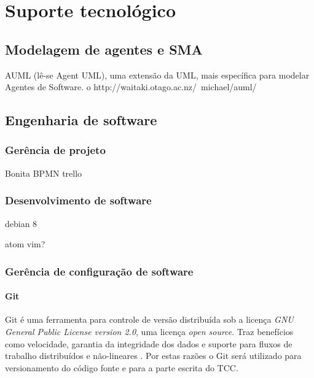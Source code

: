 \chapter[Suporte tecnológico]{Suporte tecnológico}\label{ch:suporte}

\section{Modelagem de agentes e SMA}



AUML (lê-se Agent UML), uma extensão da UML,
mais específica para modelar Agentes de Software.
o http://waitaki.otago.ac.nz/~michael/auml/



\section{Engenharia de software}

\subsection{Gerência de projeto}

Bonita BPMN
trello

\subsection{Desenvolvimento de software}

debian 8

atom
vim?

\subsection{Gerência de configuração de software}

\subsubsection{Git}

Git é uma ferramenta  para controle de versão distribuída sob a licença \textit{GNU General Public License version 2.0}, uma licença \textit{open source}.  Traz benefícios como velocidade, garantia da integridade dos dados e suporte para fluxos de trabalho distribuídos e não-lineares \cite[pág. 31]{chacon2014}. Por estas razões o Git será utilizado para versionamento do código fonte e para a parte escrita do TCC.

